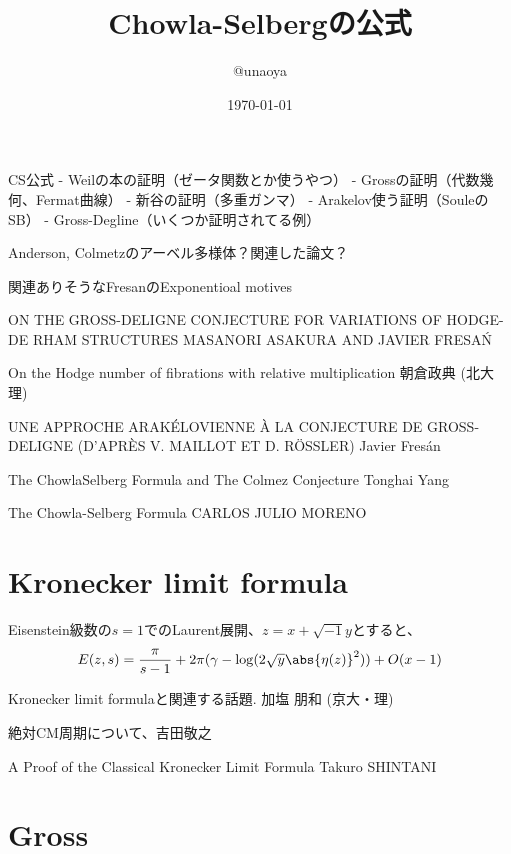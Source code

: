 \documentclass{jsarticle}
\title{Chowla-Selbergの公式}
\author{@unaoya}
\date{\today}
\begin{document}
\maketitle

CS公式
- Weilの本の証明（ゼータ関数とか使うやつ）
- Grossの証明（代数幾何、Fermat曲線）
- 新谷の証明（多重ガンマ）
- Arakelov使う証明（SouleのSB）
- Gross-Degline（いくつか証明されてる例）

Anderson, Colmetzのアーベル多様体？関連した論文？

関連ありそうなFresanのExponentioal motives

ON THE GROSS-DELIGNE CONJECTURE
FOR VARIATIONS OF HODGE-DE RHAM STRUCTURES
MASANORI ASAKURA AND JAVIER FRESA\'N

On the Hodge number of fibrations with relative multiplication
朝倉政典 (北大理)

UNE APPROCHE ARAK\'ELOVIENNE \`A LA CONJECTURE DE GROSS-DELIGNE
(D'APR\`ES V. MAILLOT ET D. R\"OSSLER)
Javier Fres\'an

The ChowlaSelberg Formula and The Colmez Conjecture
Tonghai Yang

The Chowla-Selberg Formula CARLOS JULIO MORENO

\section{Kronecker limit formula}
Eisenstein級数の$s=1$でのLaurent展開、$z=x+\sqrt{-1}y$とすると、
\begin{align*}
E(z,s)=\frac{\pi}{s-1}+2\pi(\gamma-\log(2\sqrt{y}\abs{\eta(z)}^2))+O(x-1)
\end{align*}

Kronecker limit formulaと関連する話題. 加塩 朋和 (京大・理)

絶対CM周期について、吉田敬之


A Proof of the Classical Kronecker Limit Formula
Takuro SHINTANI

\section{Gross}
\end{document}
